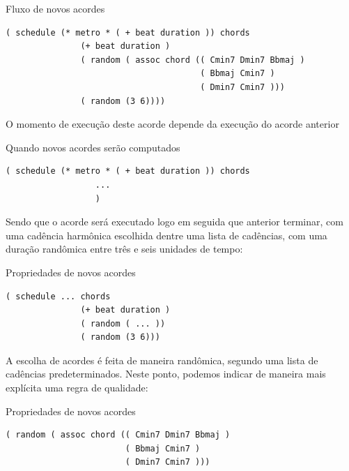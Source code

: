 \begin{example}{Fluxo de novos acordes}
\begin{verbatim}
( schedule (* metro * ( + beat duration )) chords
               (+ beat duration )
               ( random ( assoc chord (( Cmin7 Dmin7 Bbmaj )
                                       ( Bbmaj Cmin7 )
                                       ( Dmin7 Cmin7 )))
               ( random (3 6))))
\end{verbatim}
\end{example}

O momento de execução deste acorde depende da execução do acorde anterior

\begin{example}{Quando novos acordes serão computados}
\begin{verbatim}
( schedule (* metro * ( + beat duration )) chords
                  ...
                  )
\end{verbatim}
\end{example}

Sendo que o acorde será executado logo em seguida que anterior terminar, com uma cadência harmônica escolhida dentre uma lista de cadências, com uma duração randômica entre três e seis unidades de tempo:

\begin{example}{Propriedades de novos acordes}
\begin{verbatim}
( schedule ... chords
               (+ beat duration )
               ( random ( ... ))
               ( random (3 6)))
\end{verbatim}
\end{example}

A escolha de acordes é feita de maneira randômica, segundo uma lista de cadências predeterminados. Neste ponto, podemos indicar de maneira mais explícita uma regra de qualidade:

\begin{example}{Propriedades de novos acordes}
\begin{verbatim}
( random ( assoc chord (( Cmin7 Dmin7 Bbmaj )
                        ( Bbmaj Cmin7 )
                        ( Dmin7 Cmin7 )))
\end{verbatim}
\end{example}

